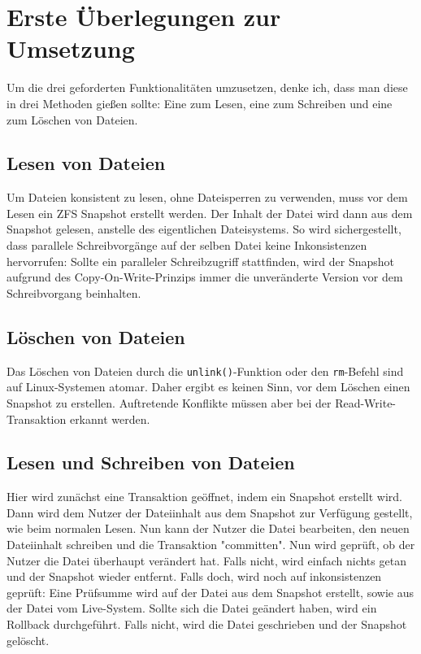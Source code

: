 \documentclass[12pt]{article}
\date{}
\begin{document}
	
\section*{Erste Überlegungen zur Umsetzung}
Um die drei geforderten Funktionalitäten umzusetzen, denke ich, dass man diese in drei Methoden gießen sollte:
Eine zum Lesen, eine zum Schreiben und eine zum Löschen von Dateien.

\subsection*{Lesen von Dateien}
Um Dateien konsistent zu lesen, ohne Dateisperren zu verwenden, muss vor dem Lesen ein ZFS Snapshot erstellt werden.
Der Inhalt der Datei wird dann aus dem Snapshot gelesen, anstelle des eigentlichen Dateisystems.
So wird sichergestellt, dass parallele Schreibvorgänge auf der selben Datei keine Inkonsistenzen hervorrufen:
Sollte ein paralleler Schreibzugriff stattfinden, wird der Snapshot aufgrund des Copy-On-Write-Prinzips immer die unveränderte Version vor dem Schreibvorgang beinhalten.

\subsection*{Löschen von Dateien}
Das Löschen von Dateien durch die \texttt{unlink()}-Funktion oder den \texttt{rm}-Befehl sind auf Linux-Systemen atomar.
Daher ergibt es keinen Sinn, vor dem Löschen einen Snapshot zu erstellen.
Auftretende Konflikte müssen aber bei der Read-Write-Transaktion erkannt werden.

\subsection*{Lesen und Schreiben von Dateien}
Hier wird zunächst eine Transaktion geöffnet, indem ein Snapshot erstellt wird. 
Dann wird dem Nutzer der Dateiinhalt aus dem Snapshot zur Verfügung gestellt, wie beim normalen Lesen.
Nun kann der Nutzer die Datei bearbeiten, den neuen Dateiinhalt schreiben und die Transaktion "committen".
Nun wird geprüft, ob der Nutzer die Datei überhaupt verändert hat.
Falls nicht, wird einfach nichts getan und der Snapshot wieder entfernt.
Falls doch, wird noch auf inkonsistenzen geprüft: Eine Prüfsumme wird auf der Datei aus dem Snapshot erstellt, sowie aus der Datei vom Live-System.
Sollte sich die Datei geändert haben, wird ein Rollback durchgeführt.
Falls nicht, wird die Datei geschrieben und der Snapshot gelöscht.
\end{document}
